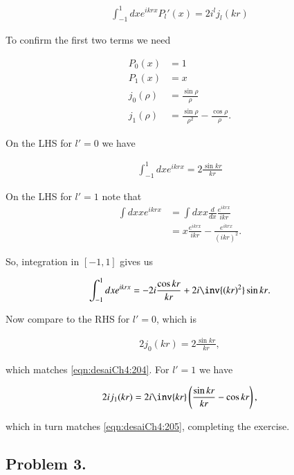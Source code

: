\begin{align}\label{eqn:desaiCh4:202}
\int_{-1}^1 dx e^{i k r x} P_l'(x) = 2 i^l j_l(kr) 
\end{align}

To confirm the first two terms we need

\begin{align}\label{eqn:desaiCh4:203}
P_0(x) &= 1 \\
P_1(x) &= x \\
j_0(\rho) &= \frac{\sin\rho}{\rho} \\
j_1(\rho) &= \frac{\sin\rho}{\rho^2} - \frac{\cos\rho}{\rho}.
\end{align}

On the LHS for $l'=0$ we have

\begin{align}\label{eqn:desaiCh4:204}
\int_{-1}^1 dx e^{i k r x} = 2 \frac{\sin{kr}}{kr}
\end{align}

On the LHS for $l'=1$ note that
\begin{align*}
\int dx x e^{i k r x} 
&= 
\int dx x \frac{d}{dx} \frac{e^{i k r x}}{ikr} \\
&= 
x \frac{e^{i k r x}}{ikr} 
- \frac{e^{i k r x}}{(ikr)^2}.
\end{align*}

So, integration in $[-1,1]$ gives us

\begin{align}\label{eqn:desaiCh4:205}
\int_{-1}^1 dx e^{i k r x} =  -2i \frac{\cos{kr}}{kr} + 2i \inv{(kr)^2} \sin{kr}.
\end{align}

Now compare to the RHS for $l'=0$, which is

\begin{align}\label{eqn:desaiCh4:206}
2 j_0(kr) = 2 \frac{\sin{kr}}{kr},
\end{align}

which matches \ref{eqn:desaiCh4:204}.  For $l'=1$ we have

\begin{align}\label{eqn:desaiCh4:207}
2 i j_1(kr) = 2i \inv{kr} \left( \frac{\sin{kr}}{kr} - \cos{kr} \right),
\end{align}

which in turn matches \ref{eqn:desaiCh4:205}, completing the exercise.

\subsection{Problem 3.}
